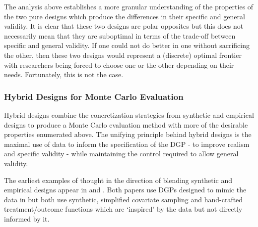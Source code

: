 \documentclass[../main.tex]{subfiles}
\begin{document}
The analysis above establishes a more granular understanding of the properties of the two pure designs which produce the differences in their specific and general validity. It is clear that these two designs are polar opposites but this does not necessarily mean that they are suboptimal in terms of the trade-off between specific and general validity. If one could not do better in one without sacrificing the other, then these two designs would represent a (discrete) optimal frontier with researchers being forced to choose one or the other depending on their needs. Fortunately, this is not the case.

\subsubsection{Hybrid Designs for Monte Carlo Evaluation}

Hybrid designs combine the concretization strategies from synthetic and empirical designs to produce a Monte Carlo evaluation method with more of the desirable properties enumerated above. The unifying principle behind hybrid designs is the maximal use of data to inform the specification of the DGP - to improve realism and specific validity - while maintaining the control required to allow general validity.\par


\vspace{\baselineskip}
The earliest examples of thought in the direction of blending synthetic and empirical designs appear in \textcite{Abadie2002LargeEffects} and \textcite{Diamond2012GeneticStudies}. Both papers use DGPs designed to mimic the data in \textcite{Lalonde1986EvaluatingData} but both use synthetic, simplified covariate sampling and hand-crafted treatment/outcome functions which are ‘inspired’ by the data but not directly informed by it.\par
\end{document}
